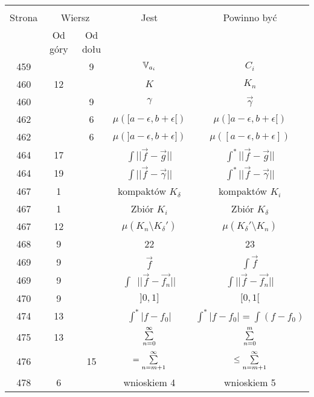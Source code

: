 \documentclass[a4paper,11pt]{article}
\begin{document}
\begin{center}
  \begin{tabular}{|c|c|c|c|c|}
    \hline
    & \multicolumn{2}{c|}{} & & \\
    Strona & \multicolumn{2}{c|}{Wiersz} & Jest
                              & Powinno być \\ \cline{2-3}
    & Od góry & Od dołu & & \\
    \hline
    459 & &  9 & $\mathbb{V}_{ a_{ i } }$ & $C_{ i }$ \\
    460 & 12 & & $K$ & $K_{ n }$ \\
    460 & &  9 & $\gamma$ & $\vec{ \gamma }$ \\
    462 & &  6 & $\mu( [ a - \epsilon, b + \epsilon [ )$
           & $\mu( ] a - \epsilon, b + \epsilon [ )$ \\
    462 & &  6 & $\mu( ] a - \epsilon, b + \epsilon ] )$
           & $\mu( [ a - \epsilon, b + \epsilon ] )$ \\
    464 & 17 & & $\int || \vec{ f } - \vec{ g } ||$
           & $\int^{ * } || \vec{ f } - \vec{ g } ||$ \\
    464 & 19 & & $\int || \vec{ f } - \vec{ \gamma } ||$
           & $\int^{ * } || \vec{ f } - \vec{ \gamma } ||$ \\
    467 &  1 & & kompaktów $K_{ \delta }$ & kompaktów $K_{ i }$ \\
    467 &  1 & & Zbiór $K_{ i }$ & Zbiór $K_{ \delta }$ \\
    467 & 12 & & $\mu( K_{ n } \setminus K_{ \delta }' )$
           & $\mu( K_{ \delta }' \setminus K_{ n } )$ \\
    468 &  9 & & 22 & 23 \\
    469 &  9 & & $\vec{ f }$ & $\int \vec{ f }$ \\
    469 &  9 & & $\int\:\; || \vec{ f } - \vec{ f_{ n } } ||$
           & $\int || \vec{ f } - \vec{ f_{ n } } ||$ \\
    470 &  9 & & $] 0, 1 ]$ & $[ 0, 1 [$ \\
    474 & 13 & & $\int^{ * } | f - f_{ 0 } |$
           & $\int^{ * } | f - f_{ 0 } | = \int ( f - f_{ 0 } )$ \\
    475 & 13 & &  $\sum\limits_{ n = 0 }^{ \infty }$ & $\sum\limits_{ n = 0 }^{ m }$ \\
    476 & & 15 & $= \sum\limits^{ \infty }_{ n = m + 1 }$
           & $\leq \sum\limits^{ \infty }_{ n = m + 1 }$ \\
    478 &  6 & & wnioskiem 4 & wnioskiem 5 \\

\end{tabular}
\end{center}
\end{document}
